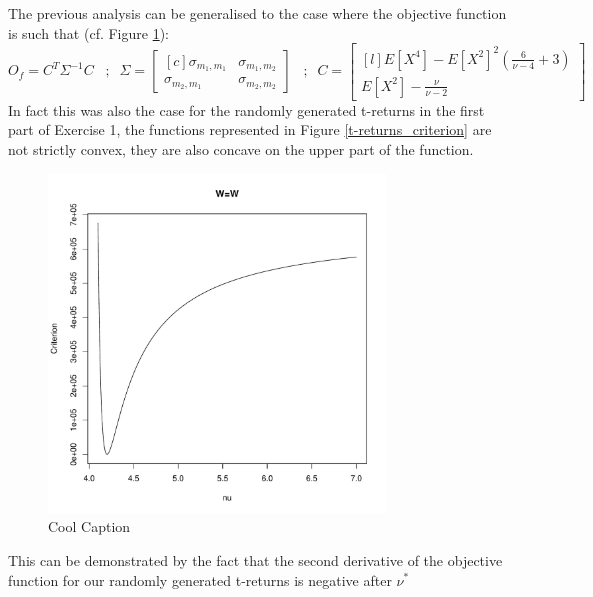 The previous analysis can be generalised to the case where the objective function is such that (cf. Figure \ref{ConcavitySPW}):
\begin{equation*}
    O_f = C^T \Sigma^{-1} C \; \; \; ; \; \;
        \Sigma=
    \begin{bmatrix}[c]
        \sigma_{m_1,m_1}    & \sigma_{m_1,m_2} \\
        \sigma_{m_2,m_1}    & \sigma_{m_2,m_2}
    \end{bmatrix}
    \;\;\; ; \; \; C = 
    \begin{bmatrix}[l]
        E[X^4]-E[X^2]^2(\frac{6}{\nu-4}+3)  \\
        E[X^2]-\frac{\nu}{\nu-2}
    \end{bmatrix}
\end{equation*}
In fact this was also the case for the randomly generated t-returns in the first part of Exercise 1, the functions represented in Figure \ref{t-returns_criterion} are not strictly convex, they are also concave on the upper part of the function.
\begin{figure}
    \centering
    \includegraphics[width=0.8\textwidth]{ConcavityS&PW.pdf}
    \caption{Cool Caption}
    \label{ConcavitySPW}
\end{figure}
This can be demonstrated by the fact that the second derivative of the objective function for our randomly generated t-returns is negative after $\nu^*$